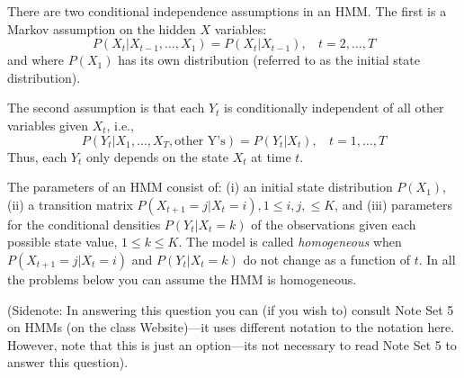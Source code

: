\documentclass[11pt]{article}
\begin{document}
There are two conditional independence assumptions in an HMM. The first is a Markov assumption on the hidden $X$ variables:
\[ P(X_t | X_{t-1},\ldots,X_1) = P(X_t | X_{t-1}), \ \ \ \ t=2,\ldots,T \]
and where $P(X_1)$ has its own distribution (referred to as the initial state distribution).

The second assumption is that each $Y_t$ is conditionally independent of all other variables given $X_t$, i.e.,
\[
P(Y_t | X_1,\ldots,X_T, \mbox{other Y's}) =
P(Y_t | X_t),  \ \ \ \ t = 1,\ldots, T
\]
Thus, each $Y_t$ only depends on the state $X_t$ at time $t$.
 
 The parameters of an HMM consist of:
 (i) an initial state distribution $P(X_1)$, 
 (ii) a transition matrix $P(X_{t+1} = j | X_{t} = i), 1 \le i, j, \le K$, and
 (iii) parameters for the conditional densities $P(Y_t | X_t = k)$ of the observations given each possible state value, $1 \le k \le K$.
 The model is called {\it homogeneous} when $P(X_{t+1} = j | X_{t} = i)$ and 
 $P(Y_t | X_t = k)$  do not change as a function of $t$. In all the problems below you can assume the HMM is homogeneous.

(Sidenote: In answering this question you can (if you wish to) consult Note Set 5 on HMMs (on the class Website)---it uses  different notation to the notation here. However, note that this is just an option---its not necessary to read Note Set 5 to answer this question).
\end{document}
